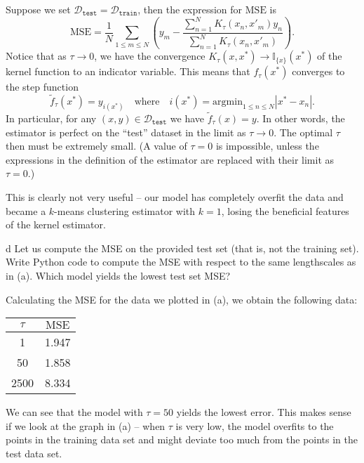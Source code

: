 \documentclass[expanded]{lkx_pset}
\begin{document}
\begin{parts}
	Suppose we set $\mathcal{D}_{\texttt{test}}=\mathcal{D}_{\texttt{train}}$, then the expression for $\mathrm{MSE}$ is
	\[
		\mathrm{MSE} = \frac{1}{N}\sum_{1\leq m \leq N} \left(y_m - \frac{\sum^N_{n=1} K_\tau(x_n, x'_m)y_n}{\sum^N_{n=1} K_\tau(x_n, x'_m)}\right).
	\]
	Notice that as $\tau \to 0$, we have the convergence $K_\tau(x, x^*)\to \mathbb{I}_{\{x\}}(x^*)$ of the kernel function to an indicator variable. This means that $f_\tau(x^*)$ converges to the step function
	\[
		\widetilde{f}_\tau(x^*) = y_{i(x^*)}\quad\textrm{where}\quad i(x^*)=\mathrm{argmin}_{1\leq n \leq N} |x^* - x_n|.
	\]
	In particular, for any $(x,y)\in \mathcal{D}_\texttt{test}$ we have $\widetilde{f}_\tau(x)=y$. In other words, the estimator is perfect on the ``test'' dataset in the limit as $\tau \to 0$. The optimal $\tau$ then must be extremely small. (A value of $\tau=0$ is impossible, unless the expressions in the definition of the estimator are replaced with their limit as $\tau = 0$.)

	This is clearly not very useful -- our model has completely overfit the data and became a $k$-means clustering estimator with $k=1$, losing the beneficial features of the kernel estimator.


	\begin{part}{d}
		Let us compute the MSE on the provided test set (that is, not the training set). Write Python code to compute the MSE with respect to the same lengthscales as in (a). Which model yields the lowest test set MSE?
	\end{part}

	Calculating the MSE for the data we plotted in (a), we obtain the following data:
	\begin{center}
		\renewcommand*{\arraystretch}{1.2}
		\begin{tabular}{|c|c|}
			\hline
			$\tau$ & $\textrm{MSE}$ \\
			\hline
			1      & 1.947          \\
			50     & 1.858          \\
			2500   & 8.334          \\
			\hline
		\end{tabular}
	\end{center}
	We can see that the model with $\tau = 50$ yields the lowest error. This makes sense if we look at the graph in (a) -- when $\tau$ is very low, the model overfits to the points in the training data set and might deviate too much from the points in the test data set.


\end{parts}
\end{document}
